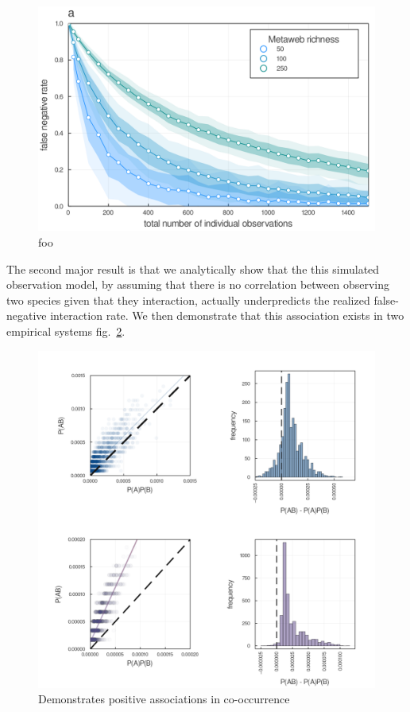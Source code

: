 \documentclass[10pt,oneside]{article}
\makeatletter
\def\maxwidth{\ifdim\Gin@nat@width>\linewidth\linewidth
\else\Gin@nat@width\fi}
\let\Oldincludegraphics\includegraphics
\renewcommand{\includegraphics}[1]{\Oldincludegraphics[width=\maxwidth]{#1}}
\makeatother
\begin{document}
\begin{figure}
\hypertarget{fig:fnr}{%
\centering
\includegraphics{./figures/ch2_fnr.png}
\caption{foo}\label{fig:fnr}
}
\end{figure}

The second major result is that we analytically show that the this
simulated observation model, by assuming that there is no correlation
between observing two species given that they interaction, actually
underpredicts the realized false-negative interaction rate. We then
demonstrate that this association exists in two empirical systems
fig.~\ref{fig:posassoc}.

\begin{figure}
\hypertarget{fig:posassoc}{%
\centering
\includegraphics{./figures/positiveassociations.png}
\caption{Demonstrates positive associations in
co-occurrence}\label{fig:posassoc}
}
\end{figure}
\end{document}
